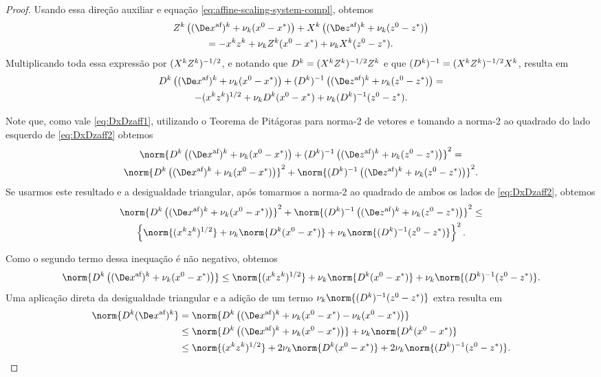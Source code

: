 \begin{proof}
	 Usando essa direção auxiliar e equação \eqref{eq:affine-scaling-system-compl}, obtemos 
	 \begin{multline*}
	 \Zk\left( \dekx +  \nuk (\xzero - \xstar)\right)+ \Xk \left(  \dekz   +  \nuk (\zzero - \zstar)\right) \\ = -\xk\zk + \nuk  \Zk(\xzero - \xstar) + \nuk  \Xk(\zzero - \zstar).
	 \end{multline*}	 
	 Multiplicando toda essa expressão por $(X^{k}Z^{k})^{-1/2}$, e notando que $D^{k}=(X^{k}Z^{k})^{-1/2}Z^{k}$ e que $(D^{k})^{-1}=(X^{k}Z^{k})^{-1/2}X^{k}$, resulta em 
	\begin{multline}
		\label{eq:DxDzaff2}
		 \Dk\left( \dekx  +  \nuk (\xzero - \xstar)\right)+ \Dik \left(  \dekz   +  \nuk (\zzero - \zstar)\right) = \\ -(\xk\zk)^{1/2} + \nuk  \Dk(\xzero - \xstar) + \nuk  \Dik(\zzero - \zstar).
		\end{multline}
	 
	 Note que, como vale  \eqref{eq:DxDzaff1}, utilizando o Teorema de Pitágoras para norma-2 de vetores e tomando a norma-2 ao quadrado do lado esquerdo de \eqref{eq:DxDzaff2} obtemos
	\begin{multline*}
			 	 \norm{\Dk\left( \dekx +  \nuk (\xzero - \xstar)\right)+ \Dik \left( \dekz  +  \nuk (\zzero - \zstar)\right)}^{2} =\\
	 	 	 	 	 \norm{\Dk\left( \dekx +  \nuk (\xzero - \xstar)\right)}^{2}+ \norm{\Dik \left( \dekz  +  \nuk (\zzero - \zstar)\right)}^{2}.
	\end{multline*}
	 Se  usarmos este resultado e a desigualdade triangular, após tomarmos a norma-2 ao quadrado de ambos os lados de \eqref{eq:DxDzaff2}, obtemos 
	 \begin{multline*}\label{eq:DxDzaff3}
	 \norm{\Dk\left( \dekx +  \nuk (\xzero - \xstar)\right)}^{2}+ \norm{\Dik \left( \dekz  +  \nuk (\zzero - \zstar)\right)}^{2} \leq \\ 
	 \left\{ \norm{(  \xk \zk   )^{1/2}} + \nuk  \norm{\Dk(\xzero - \xstar)} + \nuk  \norm{\Dik(\zzero - \zstar)} \right\}^{2}.
	 \end{multline*}

Como o segundo termo dessa inequação é não negativo, obtemos
\[
\norm{\Dk\left( \dekx +  \nuk (\xzero - \xstar)\right)} \leq  
	  \norm{(  \xk \zk  )^{1/2}} + \nuk  \norm{\Dk(\xzero - \xstar)} + \nuk  \norm{\Dik(\zzero - \zstar)}.
\]
Uma aplicação direta da desigualdade triangular e a adição de um termo  $\nuk  \norm{\Dik(\zzero - \zstar)}$ extra resulta em
\begin{align}
	\norm{\Dk \dekx} & =  \norm{\Dk\left( \dekx  +  \nuk (\xzero - \xstar)  -  \nuk (\xzero - \xstar)\right)} \notag \\ 
				 & \leq	 \norm{\Dk\left( \dekx  +  \nuk (\xzero - \xstar)\right)} +  \nuk \norm{\Dk(\xzero - \xstar)} \notag \\
				 & \leq \norm{(  \xk \zk  )^{1/2}} + 2 \nuk  \norm{\Dk(\xzero - \xstar)} + 2\nuk  \norm{\Dik(\zzero - \zstar)}.\label{eq:DxDzaff4}
\end{align}


\end{proof}
